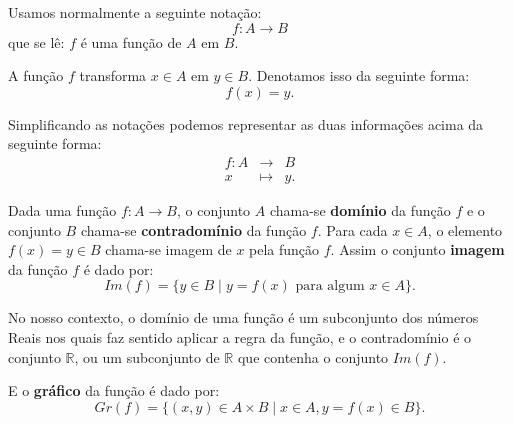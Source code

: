 \newpage

Usamos normalmente a seguinte notação:
\[f: A \rightarrow B\]
que se lê: $f$ é uma função de $A$ em $B$.

A função $f$ transforma $x \in A$ em $y \in B$. Denotamos isso da seguinte forma:
\[f(x) = y .\]

Simplificando as notações podemos representar as duas informações acima da seguinte forma:
\begin{eqnarray*}
 f: A & \rightarrow & B \\
 x & \mapsto & y.
\end{eqnarray*}

Dada uma função $f: A \rightarrow B$, o conjunto $A$ chama-se \textbf{domínio} da função $f$ e o conjunto $B$ chama-se \textbf{contradomínio} da função $f$.  Para cada $x \in A$, o elemento $f(x)= y \in B$ chama-se imagem de $x$ pela função $f$. Assim o conjunto \textbf{imagem} da função $f$ é dado por:
\[Im(f)= \{ y \in B \mid y = f(x) \text{ para algum } x \in A\} .\]

No nosso contexto, o domínio de uma função é um subconjunto dos números Reais nos quais faz sentido aplicar a regra da função, e o contradomínio é o conjunto $\mathbb{R}$, ou um subconjunto de $\mathbb{R}$ que contenha o conjunto $Im(f)$.

E o \textbf{gráfico} da função é dado por:
\[Gr(f) = \{ (x, y) \in A \times B \mid x \in A, y = f(x) \in B\} .\]

